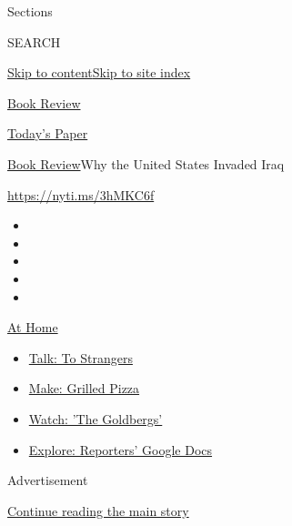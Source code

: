 Sections

SEARCH

\protect\hyperlink{site-content}{Skip to
content}\protect\hyperlink{site-index}{Skip to site index}

\href{https://www.nytimes.com/section/books/review}{Book Review}

\href{https://myaccount.nytimes.com/auth/login?response_type=cookie\&client_id=vi}{}

\href{https://www.nytimes.com/section/todayspaper}{Today's Paper}

\href{/section/books/review}{Book Review}\textbar{}Why the United States
Invaded Iraq

\url{https://nyti.ms/3hMKC6f}

\begin{itemize}
\item
\item
\item
\item
\item
\end{itemize}

\href{https://www.nytimes.com/spotlight/at-home?action=click\&pgtype=Article\&state=default\&region=TOP_BANNER\&context=at_home_menu}{At
Home}

\begin{itemize}
\tightlist
\item
  \href{https://www.nytimes.com/2020/08/03/well/family/the-benefits-of-talking-to-strangers.html?action=click\&pgtype=Article\&state=default\&region=TOP_BANNER\&context=at_home_menu}{Talk:
  To Strangers}
\item
  \href{https://www.nytimes.com/2020/08/01/at-home/coronavirus-make-pizza-on-a-grill.html?action=click\&pgtype=Article\&state=default\&region=TOP_BANNER\&context=at_home_menu}{Make:
  Grilled Pizza}
\item
  \href{https://www.nytimes.com/2020/07/31/arts/television/goldbergs-abc-stream.html?action=click\&pgtype=Article\&state=default\&region=TOP_BANNER\&context=at_home_menu}{Watch:
  'The Goldbergs'}
\item
  \href{https://www.nytimes.com/interactive/2020/at-home/even-more-reporters-editors-diaries-lists-recommendations.html?action=click\&pgtype=Article\&state=default\&region=TOP_BANNER\&context=at_home_menu}{Explore:
  Reporters' Google Docs}
\end{itemize}

Advertisement

\protect\hyperlink{after-top}{Continue reading the main story}

